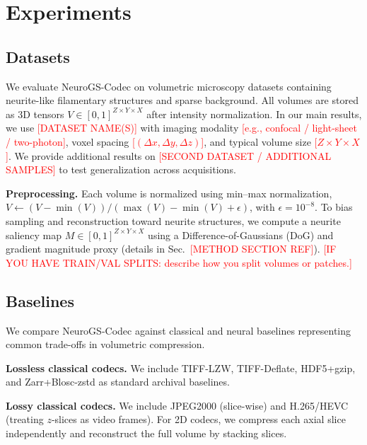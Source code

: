 \documentclass[11pt]{article}
\begin{document}
\section{Experiments}
\label{sec:experiments}

\subsection{Datasets}
\label{sec:datasets}
We evaluate NeuroGS-Codec on volumetric microscopy datasets containing neurite-like filamentary structures and sparse background. 
All volumes are stored as 3D tensors $V \in [0,1]^{Z \times Y \times X}$ after intensity normalization.
In our main results, we use \textcolor{red}{[DATASET NAME(S)]} with imaging modality \textcolor{red}{[e.g., confocal / light-sheet / two-photon]}, voxel spacing \textcolor{red}{[$(\Delta x,\Delta y,\Delta z)$]}, and typical volume size \textcolor{red}{[$Z\times Y\times X$]}.
We provide additional results on \textcolor{red}{[SECOND DATASET / ADDITIONAL SAMPLES]} to test generalization across acquisitions.

\textbf{Preprocessing.}
Each volume is normalized using min--max normalization, 
$V \leftarrow (V - \min(V))/(\max(V)-\min(V)+\epsilon)$, with $\epsilon=10^{-8}$.
To bias sampling and reconstruction toward neurite structures, we compute a neurite saliency map $M \in [0,1]^{Z \times Y \times X}$ using a Difference-of-Gaussians (DoG) and gradient magnitude proxy (details in Sec.~\textcolor{red}{[METHOD SECTION REF]}).
\textcolor{red}{[IF YOU HAVE TRAIN/VAL SPLITS: describe how you split volumes or patches.]}

\subsection{Baselines}
\label{sec:baselines}
We compare NeuroGS-Codec against classical and neural baselines representing common trade-offs in volumetric compression.

\textbf{Lossless classical codecs.}
We include TIFF-LZW, TIFF-Deflate, HDF5+gzip, and Zarr+Blosc-zstd as standard archival baselines.

\textbf{Lossy classical codecs.}
We include JPEG2000 (slice-wise) and H.265/HEVC (treating $z$-slices as video frames).
For 2D codecs, we compress each axial slice independently and reconstruct the full volume by stacking slices.
\end{document}

